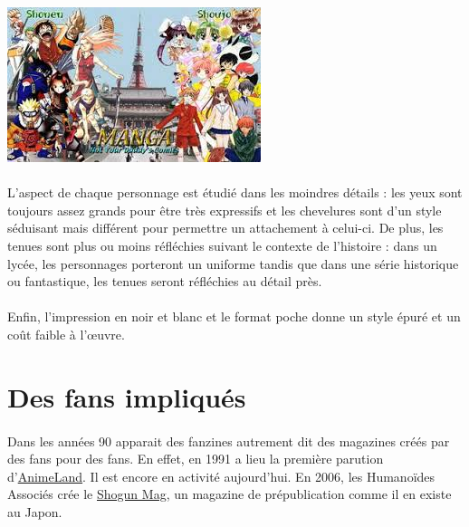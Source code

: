 \begin{center}
	\includegraphics[scale=0.8]{shojo-shonen.jpg}
\end{center}

\paragraph{} L'aspect de chaque personnage est étudié dans les moindres détails
: les yeux sont toujours assez grands pour être très expressifs et les
chevelures sont d'un style séduisant mais différent pour permettre un
attachement à celui-ci. De plus, les tenues sont plus ou moins réfléchies
suivant le contexte de l'histoire : dans un lycée, les personnages porteront un
uniforme tandis que dans une série historique ou fantastique, les tenues seront
réfléchies au détail près.

\paragraph{} Enfin, l'impression en noir et blanc et le format poche donne un
style épuré et un coût faible à l'œuvre.

\section{Des fans impliqués}

\paragraph{} Dans les années 90 apparait des fanzines autrement dit des
magazines créés par des fans pour des fans. En effet, en 1991 a lieu la
première parution d'\underline{AnimeLand}. Il est encore en activité
aujourd'hui. En 2006, les Humanoïdes Associés crée le \underline{Shogun Mag},
un magazine de prépublication comme il en existe au Japon.

